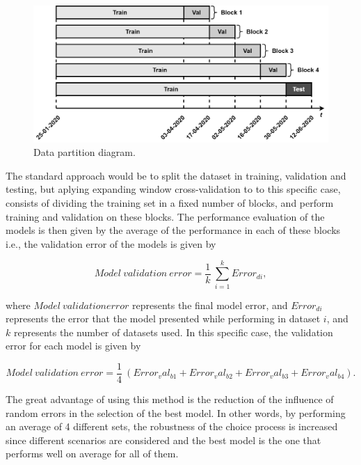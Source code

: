 \begin{figure}[h!]
    \centering
    \begin{center}
    \includegraphics[width=1\textwidth]{Images/data_partition.png}
    \caption{Data partition diagram.}
    \label{partition}
    \end{center}
\end{figure}

The standard approach would be to split the dataset in training, validation and testing, but aplying expanding window cross-validation to to this specific case, consists of dividing the training set in a fixed number of blocks, and perform training and validation on these blocks.
The performance evaluation of the models is then given by the average of the performance in each of these blocks i.e., the validation error of the models is given by

\begin{equation}
     Model\ validation\ error =\frac {1}{k}\ \sum_{i=1}^k Error_{di},
\label{err_av}
\end{equation}

where $Model\ validation error$ represents the final model error, and $Error_{di}$ represents the error that the model presented while performing in dataset $i$, and $k$ represents the number of datasets used.
In this specific case, the validation error for each model is given by

\begin{equation}
     Model\ validation\ error =\frac {1}{4}\ (Error_val_{b1} + Error_val_{b2} + Error_val_{b3} + Error_val_{b4}).
\label{err_av}
\end{equation}

The great advantage of using this method is the reduction of the influence of random errors in the selection of the best model. In other words, by performing an average of 4 different sets, the robustness of the choice process is increased since different scenarios are considered and the best model is the one that performs well on average for all of them.


